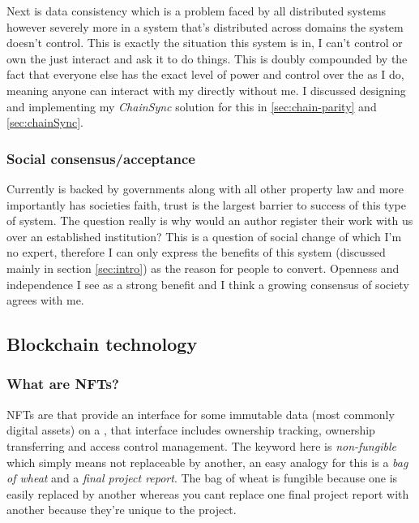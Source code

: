 Next is data consistency which is a problem faced by all distributed systems however severely more in a system that's distributed across domains the system doesn't control. This is exactly the situation this system is in, I can't control or own the  just interact and ask it to do things. This is doubly compounded by the fact that everyone else has the exact level of power and control over the  as I do, meaning anyone can interact with my  directly without me. I discussed designing and implementing my \textit{ChainSync} solution for this in \ref{sec:chain-parity} and \ref{sec:chainSync}.

\subsubsection{Social consensus/acceptance}

Currently  is backed by governments along with all other property law and more importantly has societies faith, trust is the largest barrier to success of this type of system. The question really is why would an author register their work with us over an established institution? This is a question of social change of which I'm no expert, therefore I can only express the benefits of this system (discussed mainly in section \ref{sec:intro}) as the reason for people to convert. Openness and independence I see as a strong benefit and I think a growing consensus of society agrees with me.  

\subsection{Blockchain technology}

\subsubsection{What are NFTs?}

NFTs are  that provide an interface for some immutable data (most commonly digital assets) on a , that interface includes ownership tracking, ownership transferring and access control management. The keyword here is \textit{non-fungible} which simply means not replaceable by another, an easy analogy for this is a \textit{bag of wheat} and a \textit{final project report}. The bag of wheat is fungible because one is easily replaced by another whereas you cant replace one final project report with another because they're unique to the project.


